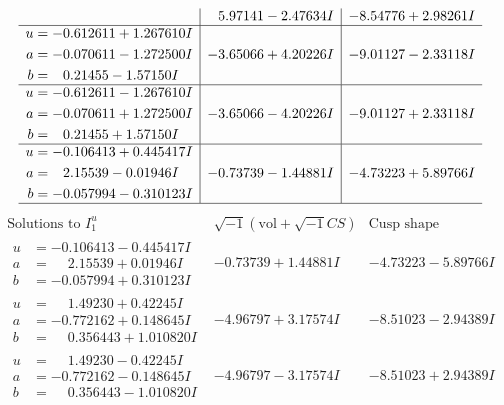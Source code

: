 \documentclass[1p]{elsarticle_modified}
\theoremstyle{definition}
\newcommand{\I}{\sqrt{-1}}
\begin{document}
$$\begin{array}{c|c|c}
 & \phantom{-}5.97141 - 2.47634 I & -8.54776 + 2.98261 I \\ \hline\begin{aligned}
u &= -0.612611 + 1.267610 I \\
a &= -0.070611 - 1.272500 I \\
b &= \phantom{-}0.21455 - 1.57150 I\end{aligned}
 & -3.65066 + 4.20226 I & -9.01127 - 2.33118 I \\ \hline\begin{aligned}
u &= -0.612611 - 1.267610 I \\
a &= -0.070611 + 1.272500 I \\
b &= \phantom{-}0.21455 + 1.57150 I\end{aligned}
 & -3.65066 - 4.20226 I & -9.01127 + 2.33118 I \\ \hline\begin{aligned}
u &= -0.106413 + 0.445417 I \\
a &= \phantom{-}2.15539 - 0.01946 I \\
b &= -0.057994 - 0.310123 I\end{aligned}
 & -0.73739 - 1.44881 I & -4.73223 + 5.89766 I\\
 \hline 
 \end{array}$$\newpage$$\begin{array}{c|c|c}  
\text{Solutions to }I^u_{1}& \I (\text{vol} + \sqrt{-1}CS) & \text{Cusp shape}\\
 \hline 
\begin{aligned}
u &= -0.106413 - 0.445417 I \\
a &= \phantom{-}2.15539 + 0.01946 I \\
b &= -0.057994 + 0.310123 I\end{aligned}
 & -0.73739 + 1.44881 I & -4.73223 - 5.89766 I \\ \hline\begin{aligned}
u &= \phantom{-}1.49230 + 0.42245 I \\
a &= -0.772162 + 0.148645 I \\
b &= \phantom{-}0.356443 + 1.010820 I\end{aligned}
 & -4.96797 + 3.17574 I & -8.51023 - 2.94389 I \\ \hline\begin{aligned}
u &= \phantom{-}1.49230 - 0.42245 I \\
a &= -0.772162 - 0.148645 I \\
b &= \phantom{-}0.356443 - 1.010820 I\end{aligned}
 & -4.96797 - 3.17574 I & -8.51023 + 2.94389 I \\ \hline\begin{aligned}

\end{aligned}
\end{array}$$
\end{document}
